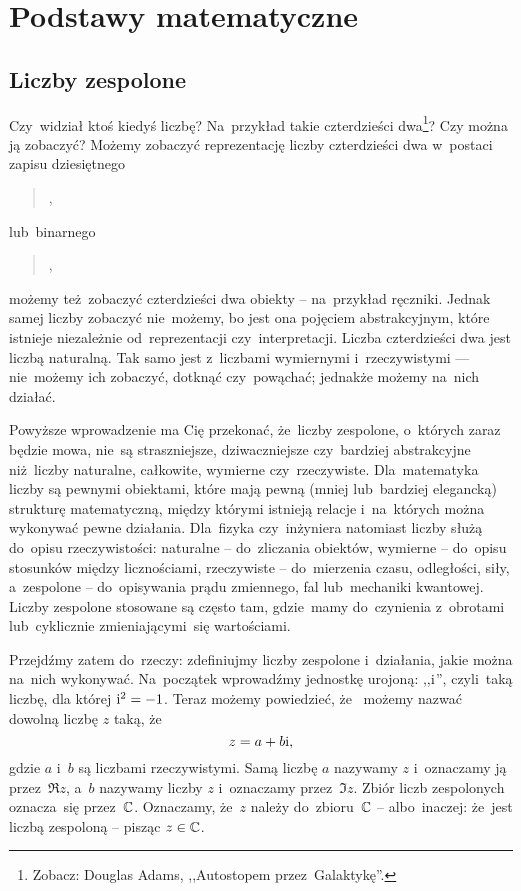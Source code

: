 \chapter{Podstawy matematyczne}\label{ch:podstawy}
\section{Liczby zespolone}
Czy~widział ktoś kiedyś liczbę? Na~przykład takie czterdzieści
dwa\footnote{Zobacz: Douglas Adams, ,,Autostopem przez~Galaktykę''.}? Czy można ją
zobaczyć? Możemy zobaczyć reprezentację liczby czterdzieści dwa w~postaci zapisu
dziesiętnego
\begin{quotation}
	,
\end{quotation}
lub~binarnego
\begin{quotation}
	,
\end{quotation}
możemy też~zobaczyć czterdzieści dwa obiekty -- na~przykład ręczniki.
Jednak samej liczby zobaczyć nie~możemy, bo jest ona pojęciem abstrakcyjnym, które
istnieje niezależnie od~reprezentacji czy~interpretacji. Liczba czterdzieści dwa
jest liczbą naturalną. Tak samo jest z~liczbami wymiernymi i~rzeczywistymi ---
nie~możemy ich zobaczyć, dotknąć czy~powąchać; jednakże możemy na~nich działać.

Powyższe wprowadzenie ma Cię przekonać, że~liczby zespolone, o~których zaraz
będzie mowa, nie~są straszniejsze, dziwaczniejsze czy~bardziej abstrakcyjne
niż~liczby naturalne, całkowite, wymierne czy~rzeczywiste.
Dla~matematyka liczby są pewnymi obiektami, które mają pewną (mniej lub~bardziej elegancką)
strukturę matematyczną, między którymi istnieją relacje i~na~których można wykonywać pewne działania.
Dla~fizyka czy~inżyniera natomiast liczby służą do~opisu rzeczywistości:
naturalne -- do~zliczania obiektów, wymierne -- do~opisu stosunków między licznościami,
rzeczywiste -- do~mierzenia czasu, odległości, siły, a~zespolone -- do~opisywania prądu zmiennego,
fal lub~mechaniki kwantowej. Liczby zespolone stosowane są często tam, gdzie~mamy do~czynienia
z~obrotami lub~cyklicznie zmieniającymi~się wartościami.

Przejdźmy zatem do~rzeczy: zdefiniujmy liczby zespolone i~działania, jakie można
na~nich wykonywać.
Na~początek wprowadźmy jednostkę urojoną: ,,${\mathrm i}$'', czyli~taką liczbę, dla której ${\mathrm i}^2=-1$.
Teraz możemy powiedzieć, że~
możemy nazwać dowolną liczbę $z$ taką, że
$$
	z = a + b {\mathrm i},
$$
gdzie $a$ i~$b$ są liczbami rzeczywistymi. Samą liczbę $a$ nazywamy
 $z$ i~oznaczamy ją przez~$\Re z$,
a~$b$ nazywamy  
liczby $z$ i~oznaczamy przez~$\Im z$.
Zbiór liczb zespolonych oznacza~się przez~$\mathbb{C}$. Oznaczamy, że~$z$ należy do~zbioru~$\mathbb{C}$
-- albo~inaczej: że~jest liczbą zespoloną -- pisząc $z\in\mathbb{C}$.


